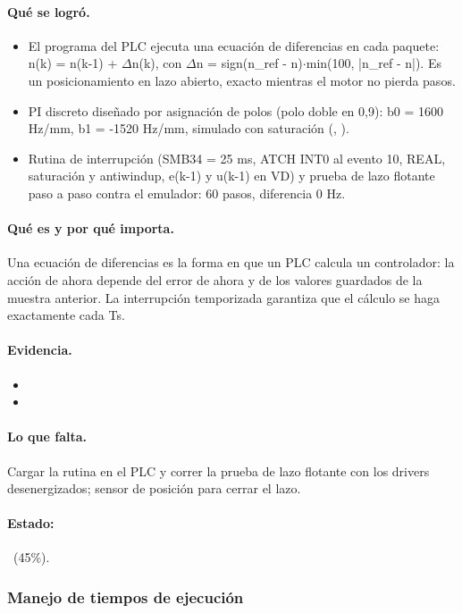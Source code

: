 \documentclass[a4paper,11pt]{article}
\begin{document}
\paragraph{Qué se logró.}
\begin{itemize}
\item El programa  del PLC ejecuta una ecuación de diferencias en cada paquete: n(k) = n(k-1) + $\Delta$n(k), con $\Delta$n = sign(n\_ref - n)$\cdot$min(100, |n\_ref - n|). Es un posicionamiento en lazo abierto, exacto mientras el motor no pierda pasos.
\item PI discreto diseñado por asignación de polos (polo doble en 0,9): b0 = 1600 Hz/mm, b1 = -1520 Hz/mm, simulado con saturación (, ).
\item Rutina de interrupción  (SMB34 = 25 ms, ATCH INT0 al evento 10, REAL, saturación y antiwindup, e(k-1) y u(k-1) en VD) y prueba de lazo flotante paso a paso contra el emulador: 60 pasos, diferencia 0 Hz.
\end{itemize}
\paragraph{Qué es y por qué importa.} Una ecuación de diferencias es la forma en que un PLC calcula un controlador: la acción de ahora depende del error de ahora y de los valores guardados de la muestra anterior. La interrupción temporizada garantiza que el cálculo se haga exactamente cada Ts.
\paragraph{Evidencia.}
\begin{itemize}\small
\item {}
\item {}
\end{itemize}
\paragraph{Lo que falta.} Cargar la rutina en el PLC y correr la prueba de lazo flotante con los drivers desenergizados; sensor de posición para cerrar el lazo.
\paragraph{Estado:} \parcial~(45\%).
\subsubsection{Manejo de tiempos de ejecución}
\end{document}
